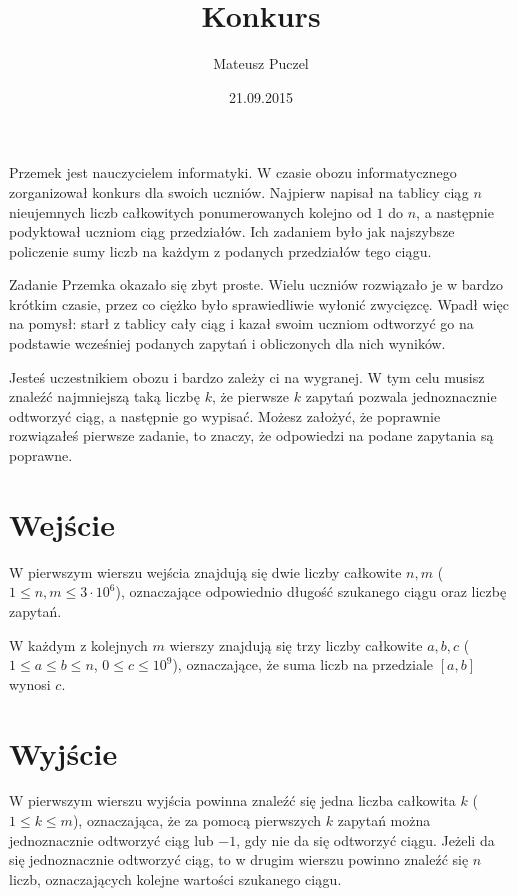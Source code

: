 \documentclass[zad,zawodnik,utf8]{sinol}
\title{Konkurs}
\author{Mateusz Puczel}
\date{21.09.2015}
\begin{document}
  \begin{tasktext}%
Przemek jest nauczycielem informatyki. W czasie obozu informatycznego zorganizował konkurs dla swoich uczniów.
Najpierw napisał na tablicy ciąg $n$ nieujemnych liczb całkowitych ponumerowanych kolejno od $1$ do $n$, a następnie podyktował uczniom ciąg przedziałów.
Ich zadaniem było jak najszybsze policzenie sumy liczb na każdym z podanych przedziałów tego ciągu.

Zadanie Przemka okazało się zbyt proste. Wielu uczniów rozwiązało je w bardzo krótkim czasie, przez co ciężko było sprawiedliwie
wyłonić zwycięzcę. Wpadł więc na pomysł: starł z tablicy cały ciąg i kazał swoim uczniom odtworzyć go na podstawie wcześniej podanych
zapytań i obliczonych dla nich wyników.

Jesteś uczestnikiem obozu i bardzo zależy ci na wygranej. W tym celu musisz znaleźć najmniejszą taką liczbę $k$,
że pierwsze $k$ zapytań pozwala jednoznacznie odtworzyć ciąg, a następnie go wypisać. Możesz założyć, że poprawnie rozwiązałeś
pierwsze zadanie, to znaczy, że odpowiedzi na podane zapytania są poprawne.
  
  \section{Wejście}
W pierwszym wierszu wejścia znajdują się dwie liczby całkowite $n, m$ ($1 \leq n, m \leq 3\cdot10^6$), 
oznaczające odpowiednio długość szukanego ciągu oraz liczbę zapytań.

W każdym z kolejnych $m$ wierszy znajdują się trzy liczby całkowite $a, b, c$ ($1 \leq a \leq b \leq n$, $0 \leq c \leq 10^{9}$),
oznaczające, że suma liczb na przedziale $[a, b]$ wynosi $c$.

  \section{Wyjście}
W pierwszym wierszu wyjścia powinna znaleźć się jedna liczba całkowita $k$ ($1 \leq k \leq m$), oznaczająca, że
za pomocą pierwszych $k$ zapytań można jednoznacznie odtworzyć ciąg lub $-1$, gdy nie da się odtworzyć ciągu.
Jeżeli da się jednoznacznie odtworzyć ciąg, to w drugim wierszu powinno znaleźć się $n$ liczb, oznaczających kolejne wartości szukanego ciągu.
    \makecompactexample


  \end{tasktext}
\end{document}
